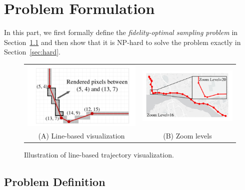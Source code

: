 \section{Problem Formulation}\label{sec:pro}
In this part, we first formally define the \textit{fidelity-optimal sampling problem} in Section~\ref{sec:def} and then show that it is NP-hard to solve the problem exactly in Section~\ref{sec:hard}.

\begin{figure}
	\centering
	\small
	\begin{tabular}{cc}
        \includegraphics[width=0.43\columnwidth]{pictures/problemsolveing/RenderedPixels}
		&
        \includegraphics[width=0.48\columnwidth]{pictures/problemsolveing/TrajZoomIn}		
		\\
		(A) Line-based visualization
		&
        (B) Zoom levels
	\end{tabular}
	\vspace{-2mm}
	\caption{Illustration of line-based trajectory visualization.} \label{fig:line}
	\vspace{-2mm}
\end{figure}


\subsection{Problem Definition}\label{sec:def}


